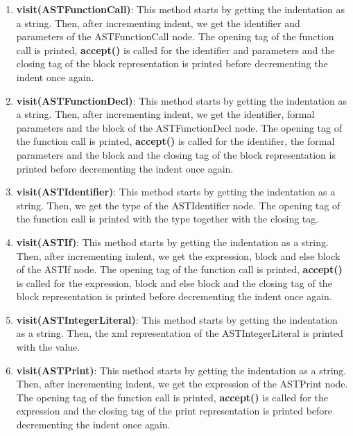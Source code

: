\documentclass{article}
\begin{document}
\begin{enumerate}
					\item \textbf{visit(ASTFunctionCall)}: This method starts by getting the indentation as a string. Then, after incrementing indent, we get the identifier and parameters of the ASTFunctionCall node. The opening tag of the function call is printed, \textbf{accept()} is called for the identifier and parameters and the closing tag of the block representation is printed before decrementing the indent once again.	
				
					\item \textbf{visit(ASTFunctionDecl)}: This method starts by getting the indentation as a string. Then, after incrementing indent, we get the identifier, formal parameters and the block of the ASTFunctionDecl node. The opening tag of the function call is printed, \textbf{accept()} is called for the identifier, the formal parameters and the block and the closing tag of the block representation is printed before decrementing the indent once again.		
			
					\item \textbf{visit(ASTIdentifier)}: This method starts by getting the indentation as a string. Then, we get the type of the ASTIdentifier node. The opening tag of the function call is printed with the type together with the closing tag.	
					
							\item \textbf{visit(ASTIf)}: This method starts by getting the indentation as a string. Then, after incrementing indent, we get the expression, block and else block of the ASTIf node. The opening tag of the function call is printed, \textbf{accept()} is called for the expression, block and else block and the closing tag of the block representation is printed before decrementing the indent once again.	
							
					\item \textbf{visit(ASTIntegerLiteral)}: This method starts by getting the indentation as a string. Then, the xml representation of the ASTIntegerLiteral is printed with the value.
					
					\item \textbf{visit(ASTPrint)}: This method starts by getting the indentation as a string. Then, after incrementing indent, we get the expression of the ASTPrint node. The opening tag of the function call is printed, \textbf{accept()} is called for the expression and the closing tag of the print representation is printed before decrementing the indent once again.
					

\end{enumerate}
\end{document}
